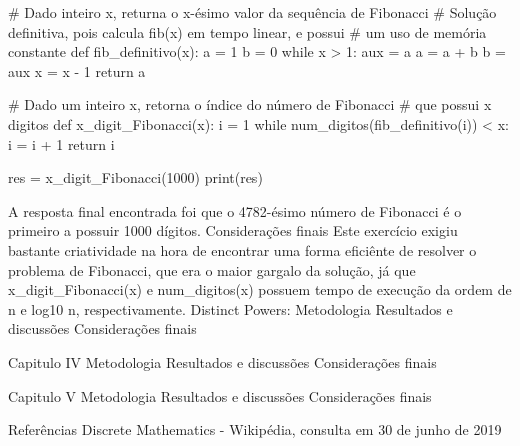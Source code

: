             # Dado inteiro x, returna o x-ésimo valor da sequência de Fibonacci
            # Solução definitiva, pois calcula fib(x) em tempo linear, e possui 
            # um uso de memória constante
            def fib_definitivo(x):
                a = 1
                b = 0
                while x > 1:
                    aux = a
                    a = a + b
                    b = aux
                    x = x - 1
                return a

            # Dado um inteiro x, retorna o índice do número de Fibonacci 
            # que possui x digitos
            def x_digit_Fibonacci(x):
                i = 1
                while num_digitos(fib_definitivo(i)) < x:
                    i = i + 1
                return i

            res = x_digit_Fibonacci(1000)
            print(res)

            A resposta final encontrada foi que o 4782-ésimo número de Fibonacci é o primeiro a possuir 1000 dígitos.
        Considerações finais
            Este exercício exigiu bastante criatividade na hora de encontrar uma forma eficiênte de resolver o problema de Fibonacci, que era o maior gargalo da solução, já que x_digit_Fibonacci(x) e num_digitos(x) possuem tempo de execução da ordem de n e log10 n, respectivamente. 
    Distinct Powers:
        Metodologia
        Resultados e discussões
        Considerações finais

Capitulo IV
    Metodologia
    Resultados e discussões
    Considerações finais

Capitulo V
    Metodologia
    Resultados e discussões
    Considerações finais

Referências
    Discrete Mathematics - Wikipédia, consulta em 30 de junho de 2019